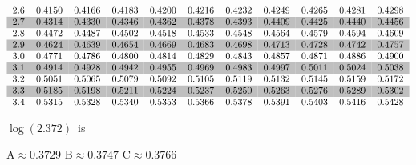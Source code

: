 \documentclass[handout]{beamer}
\begin{document}
{{\begin{equation*}
\begin{tabular}{*{11}{c}}
2.6 & 0.4150 & 0.4166 & 0.4183 & 0.4200 & 0.4216 & 0.4232 & 0.4249 & 0.4265 & 0.4281 & 0.4298 \\
\rowcolor[gray]{0.75}
2.7 & 0.4314 & 0.4330 & 0.4346 & 0.4362 & 0.4378 & 0.4393 & 0.4409 & 0.4425 & 0.4440 & 0.4456 \\
2.8 & 0.4472 & 0.4487 & 0.4502 & 0.4518 & 0.4533 & 0.4548 & 0.4564 & 0.4579 & 0.4594 & 0.4609 \\
\rowcolor[gray]{0.75}
2.9 & 0.4624 & 0.4639 & 0.4654 & 0.4669 & 0.4683 & 0.4698 & 0.4713 & 0.4728 & 0.4742 & 0.4757 \\
3.0 & 0.4771 & 0.4786 & 0.4800 & 0.4814 & 0.4829 & 0.4843 & 0.4857 & 0.4871 & 0.4886 & 0.4900 \\
\rowcolor[gray]{0.75}
3.1 & 0.4914 & 0.4928 & 0.4942 & 0.4955 & 0.4969 & 0.4983 & 0.4997 & 0.5011 & 0.5024 & 0.5038 \\
3.2 & 0.5051 & 0.5065 & 0.5079 & 0.5092 & 0.5105 & 0.5119 & 0.5132 & 0.5145 & 0.5159 & 0.5172 \\
\rowcolor[gray]{0.75}
3.3 & 0.5185 & 0.5198 & 0.5211 & 0.5224 & 0.5237 & 0.5250 & 0.5263 & 0.5276 & 0.5289 & 0.5302 \\
3.4 & 0.5315 & 0.5328 & 0.5340 & 0.5353 & 0.5366 & 0.5378 & 0.5391 & 0.5403 & 0.5416 & 0.5428 \\
\end{tabular}
\end{equation*}
}
  

$\log(2.372)$\ is\
\begin{center}
  A$\approx 0.3729$
  \quad 
  B$\approx 0.3747$
  \quad 
  C$\approx 0.3766$
  \pause
  \quad{} 
\end{center}
\bigskip


}
\end{document}
